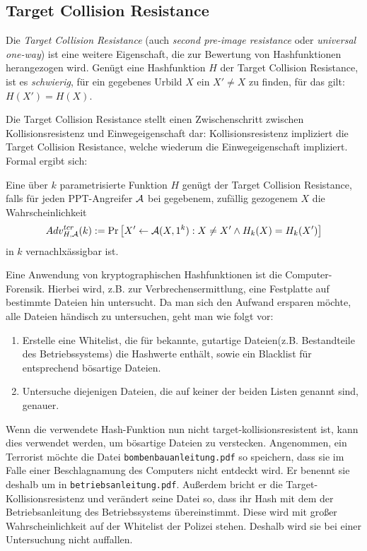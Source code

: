 \subsection{Target Collision Resistance}
Die \textit{Target Collision Resistance} (auch \textit{second pre-image resistance} oder \textit{universal one-way}) ist eine weitere Eigenschaft, die zur
Bewertung von Hashfunktionen herangezogen wird. Genügt eine Hashfunktion $H$ der Target Collision Resistance, ist es \textit{schwierig}, für ein gegebenes
Urbild $X$ ein $X' \not = X$ zu finden, für das gilt: $H(X') = H(X)$.

Die Target Collision Resistance stellt einen Zwischenschritt zwischen Kollisionsresistenz und Einwegeigenschaft dar: Kollisionsresistenz impliziert die
Target Collision Resistance, welche wiederum die Einwegeigenschaft impliziert. Formal ergibt sich:\\

\begin{definition}
Eine über $k$ parametrisierte Funktion $H$ genügt der Target Collision Resistance, falls für jeden PPT-Angreifer $\mathcal{A}$ bei gegebenem, zufällig gezogenem $X$ die Wahrscheinlichkeit
\begin{equation*}
Adv^{tcr}_{H,\mathcal{A}}(k):= \Pr \left[ X' \leftarrow \mathcal{A}(X, 1^k) : X \neq X' \land H_k(X) = H_k(X')\right]
\end{equation*}
in $k$ vernachlxässigbar ist.
\end{definition}

\begin{beispiel}
Eine Anwendung von kryptographischen Hashfunktionen ist die
Computer-Forensik. Hierbei wird, z.B. zur Verbrechensermittlung, eine
Festplatte auf bestimmte Dateien hin untersucht. Da man sich den Aufwand
ersparen möchte, alle Dateien händisch zu untersuchen, geht man wie
folgt vor:
\begin{enumerate}
  \item Erstelle eine Whitelist, die für bekannte, gutartige
    Dateien(z.B. Bestandteile des Betriebssystems) die Hashwerte
    enthält, sowie ein Blacklist für entsprechend bösartige Dateien.
  \item Untersuche diejenigen Dateien, die auf keiner der beiden Listen
    genannt sind, genauer.
\end{enumerate}

Wenn die verwendete Hash-Funktion nun nicht target-kollisionsresistent ist,
kann dies verwendet werden, um bösartige Dateien zu
verstecken. Angenommen, ein Terrorist möchte die Datei
\texttt{bombenbauanleitung.pdf} so speichern, dass sie im Falle einer
Beschlagnamung des Computers nicht entdeckt wird. Er benennt sie deshalb
um in \texttt{betriebsanleitung.pdf}. Außerdem bricht er die Target-Kollisionsresistenz
und verändert seine Datei so, dass ihr Hash mit dem der Betriebsanleitung
des Betriebssystems übereinstimmt. Diese wird mit großer
Wahrscheinlichkeit auf der Whitelist der Polizei stehen. Deshalb wird
sie bei einer Untersuchung nicht auffallen.\cite{Stevens2012}
\end{beispiel}

